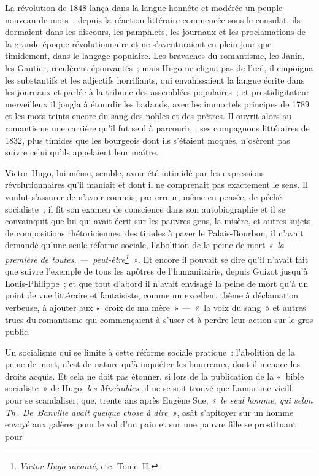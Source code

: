 \documentclass[french,twoside]{book} %
\begin{document}
La révolution de 1848 lança dans la langue honnête et modérée un peuple nouveau de mots ; depuis la réaction littéraire commencée sous le consulat, ils dormaient dans les discours, les pamphlets, les journaux et les proclamations de la grande époque révolutionnaire et ne s’aventuraient en plein jour que timidement, dans le langage populaire. Les bravaches du romantisme, les Janin, les Gautier, reculèrent épouvantés ; mais Hugo ne cligna pas de l’œil, il empoigna les substantifs et les adjectifs horrifiants, qui envahissaient la langue écrite dans les journaux et parlée à la tribune des assemblées populaires ; et prestidigitateur merveilleux il jongla à étourdir les badauds, avec les immortels principes de 1789 et les mots teints encore du sang des nobles et des prêtres. Il ouvrit alors au romantisme une carrière qu’il fut seul à parcourir ; ses compagnons littéraires de 1832, plus timides que les bourgeois dont ils s’étaient moqués, n’osèrent pas suivre celui qu’ils appelaient leur maître.\par
Victor Hugo, lui-même, semble, avoir été intimidé par les expressions révolutionnaires qu’il maniait et  
\label{p44}dont il ne comprenait pas exactement le sens. Il voulut s’assurer de n’avoir commis, par erreur, même en pensée, de péché socialiste ; il fit son examen de conscience dans son autobiographie et il se convainquit que lui qui avait écrit sur les pauvres gens, la misère, et autres sujets de compositions rhétoriciennes, des tirades à paver le Palais-Bourbon, il n’avait demandé qu’une seule réforme sociale, l’abolition de la peine de mort \emph{« la première de toutes, — peut-être\footnote{\emph{Victor Hugo raconté}, etc. Tome II.} »}. Et encore il pouvait se dire qu’il n’avait fait que suivre l’exemple de tous les apôtres de l’humanitairie, depuis Guizot jusqu’à Louis-Philippe ; et que tout d’abord il n’avait envisagé la peine de mort qu’à un point de vue littéraire et fantaisiste, comme un excellent thème à déclamation verbeuse, à ajouter aux « croix de ma mère » — « la voix du sang » et autres trucs du romantisme qui commençaient à s’user et à perdre leur action sur le gros public.\par
Un socialisme qui se limite à cette réforme sociale pratique : l’abolition de la peine de mort, n’est de nature qu’à inquiéter les bourreaux, dont il menace les droits acquis. Et cela ne doit pas étonner, si lors de la publication de la « bible socialiste » de Hugo, \emph{les Misérables}, il ne se soit trouvé que Lamartine vieilli pour se scandaliser, que, trente ans après Eugène Sue, \emph{« le seul homme, qui selon Th. De Banville avait quelque chose à dire »}, osât s’apitoyer sur un homme envoyé aux galères pour le vol d’un pain et sur une pauvre fille se prostituant pour  
\end{document}

